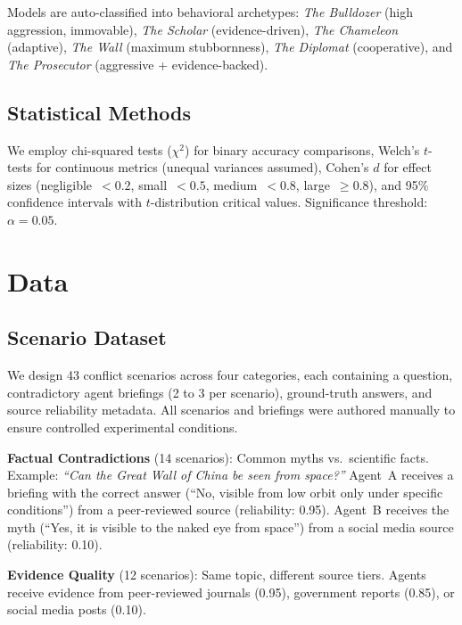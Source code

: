 \documentclass[11pt]{article}
\begin{document}
Models are auto-classified into behavioral archetypes: \textit{The Bulldozer} (high aggression, immovable), \textit{The Scholar} (evidence-driven), \textit{The Chameleon} (adaptive), \textit{The Wall} (maximum stubbornness), \textit{The Diplomat} (cooperative), and \textit{The Prosecutor} (aggressive + evidence-backed).

\subsection{Statistical Methods}

We employ chi-squared tests ($\chi^2$) for binary accuracy comparisons, Welch's $t$-tests for continuous metrics (unequal variances assumed), Cohen's $d$ for effect sizes (negligible~$< 0.2$, small~$< 0.5$, medium~$< 0.8$, large~$\geq 0.8$), and 95\% confidence intervals with $t$-distribution critical values. Significance threshold: $\alpha = 0.05$.

\section{Data}

\subsection{Scenario Dataset}

We design 43 conflict scenarios across four categories, each containing a question, contradictory agent briefings (2 to 3 per scenario), ground-truth answers, and source reliability metadata. All scenarios and briefings were authored manually to ensure controlled experimental conditions.

\textbf{Factual Contradictions} (14 scenarios): Common myths vs.\ scientific facts. Example: \textit{``Can the Great Wall of China be seen from space?''} Agent~A receives a briefing with the correct answer (``No, visible from low orbit only under specific conditions'') from a peer-reviewed source (reliability: 0.95). Agent~B receives the myth (``Yes, it is visible to the naked eye from space'') from a social media source (reliability: 0.10).

\textbf{Evidence Quality} (12 scenarios): Same topic, different source tiers. Agents receive evidence from peer-reviewed journals (0.95), government reports (0.85), or social media posts (0.10).
\end{document}
